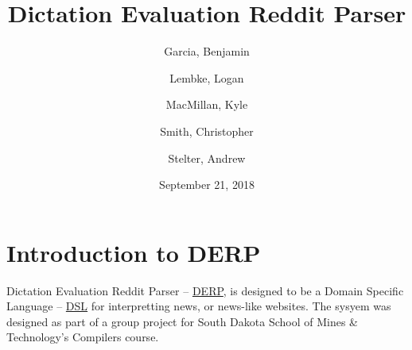 \documentclass{article}
\title{\textbf{Dictation Evaluation Reddit Parser}}
\author{
Garcia, Benjamin \and
Lembke, Logan \and 
MacMillan, Kyle  \and 
Smith, Christopher \and 
Stelter, Andrew 
}
\date{September 21, 2018}
\begin{document}
\maketitle

\newpage
\tableofcontents
{}




\newpage
\hypersetup{
    colorlinks,
    citecolor=blue,
    filecolor=black,
    linkcolor=blue,
    urlcolor=blue
}

\section{\textbf{Introduction to DERP}}

\setcounter{page}{1} %
Dictation Evaluation Reddit Parser -- \href{https://gitlab.mcs.sdsmt.edu/7184015/DERP}{DERP}, is designed to be a Domain Specific Language -- \href{https://en.wikipedia.org/wiki/Domain-specific_language}{DSL} for interpretting news, or news-like websites. The sysyem was designed as part of a group project for South Dakota School of Mines \& Technology's Compilers course.
\end{document}
